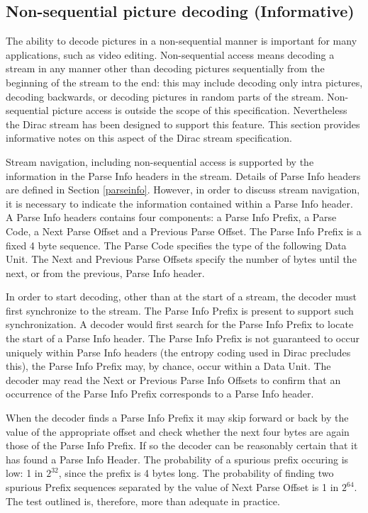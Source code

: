 \begin{informative*}
\subsection{Non-sequential picture decoding (Informative)}

The ability to decode pictures in a non-sequential manner is important for many applications, 
such as video editing. Non-sequential access means decoding a stream in any manner other 
than decoding pictures sequentially from the beginning of the stream to the end: this may
include decoding only intra pictures, decoding backwards, or decoding pictures in random
parts of the stream. Non-sequential 
picture access is outside the scope of this specification. Nevertheless the Dirac stream has 
been designed to support this feature. This section provides informative notes on this aspect 
of the Dirac stream specification.

Stream navigation, including non-sequential access is supported by the information in the Parse 
Info headers in the stream. Details of Parse Info headers are defined in Section \ref{parseinfo}. However, 
in order to discuss stream navigation, it is necessary to indicate the information contained within 
a Parse Info header. A Parse Info headers contains four components: a Parse Info Prefix, a 
Parse Code, a Next Parse Offset and a Previous Parse Offset.  The Parse Info Prefix is a fixed 
4 byte sequence. The Parse Code specifies the type of the following Data Unit. The Next and 
Previous Parse Offsets specify the number of bytes until the next, or from the previous, Parse 
Info header.

In order to start decoding, other than at the start of a stream, the decoder must first synchronize 
to the stream. The Parse Info Prefix is present to support such synchronization. A decoder would 
first search for the Parse Info Prefix to locate the start of a Parse Info header. The Parse Info 
Prefix is not guaranteed to occur uniquely within Parse Info headers (the entropy coding used in 
Dirac precludes this), the Parse Info Prefix may, by chance, occur within a Data Unit. The decoder 
may read the Next or Previous Parse Info Offsets to confirm that an occurrence of the Parse Info 
Prefix corresponds to a Parse Info header.

When the decoder finds a Parse Info Prefix it may skip forward or back by the value of the appropriate offset
 and check whether the next four bytes are again those of the Parse Info Prefix. If so the 
decoder can be reasonably certain that it has found a Parse Info Header. The probability of a spurious 
prefix occuring is low: 1 in $2^{32}$, since the prefix is 4 bytes long. The probability of finding 
two spurious Prefix sequences separated by the value of Next Parse Offset is 1 in $2^{64}$. The test outlined is, therefore, 
more than adequate in practice. 


\end{informative*}
